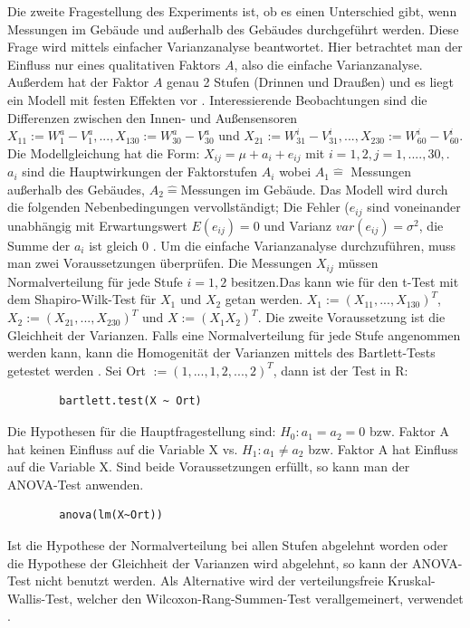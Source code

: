 \documentclass[ ngerman, fontsize= 12pt, paper=a4, headings=big, titlepage=true]{article}
\begin{document}
	Die zweite Fragestellung des Experiments ist, ob es einen Unterschied gibt, wenn Messungen im Gebäude und außerhalb des Gebäudes durchgeführt werden. Diese Frage wird mittels einfacher Varianzanalyse beantwortet. Hier betrachtet man der Einfluss nur eines qualitativen Faktors $A $, also die einfache Varianzanalyse. Außerdem hat der Faktor $A $ genau 2 Stufen (Drinnen und Draußen) und es liegt ein Modell mit festen Effekten vor \cite{3}. Interessierende Beobachtungen sind  die Differenzen zwischen den Innen- und Außensensoren $X_{11} := W^a_1 - V^a_1, ..., X_{1 30} := W^a_{30} - V^a_{30} $ und $X_{21} := W^i_{31} - V^i_{31}, ..., X_{2 30} := W^i_{60} - V^i_{60}  $. \\ 
	
	Die Modellgleichung hat die Form: $ X_{ij} = \mu + a_i + e_{ij}  $ mit $ i = 1, 2, j = 1,...., 30, $. $a_i $ sind die Hauptwirkungen der Faktorstufen $A_i $ wobei $ A_1 \hat{=} $ Messungen außerhalb des Gebäudes, $ A_2 \hat{=} $Messungen im Gebäude. Das Modell wird durch die folgenden Nebenbedingungen vervollständigt; Die Fehler ($e_{ij} $ sind voneinander unabhängig mit Erwartungswert $E(e_{ij}) = 0 $ und Varianz $var(e_{ij} ) = \sigma^2 $, die Summe der $a_i $ ist gleich 0 \cite{3}. Um die einfache Varianzanalyse durchzuführen, muss man zwei Voraussetzungen überprüfen. Die Messungen $X_{ij} $  müssen Normalverteilung für jede Stufe $i = 1, 2 $ besitzen.Das kann wie für den t-Test mit dem Shapiro-Wilk-Test für $X_1 $ und $X_2 $ getan werden. $X_1 := (X_{11}, ..., X_{1 30})^T $, $ X_2 := (X_{21}, ..., X_{2 30})^T $ und $X := (X_1 X_2)^T $. Die zweite Voraussetzung ist die Gleichheit der Varianzen. Falls eine Normalverteilung für jede Stufe angenommen werden kann, kann die Homogenität der Varianzen mittels des Bartlett-Tests getestet werden  \cite{4}. Sei Ort $:= (1,...,1,2,...,2)^T $, dann ist der Test in R: \begin{lstlisting}
		bartlett.test(X ~ Ort)
	\end{lstlisting}

	Die Hypothesen für die Hauptfragestellung sind: $ H_0: a_1 = a_2 = 0 $ bzw. Faktor A hat keinen Einfluss auf die Variable X  vs.  $H_1: a_1 \neq a_2 $ bzw. Faktor A hat Einfluss auf die Variable X. Sind beide Voraussetzungen erfüllt, so kann man der ANOVA-Test anwenden.\begin{lstlisting}
		anova(lm(X~Ort))
	\end{lstlisting}  

	Ist die Hypothese der Normalverteilung bei allen Stufen abgelehnt worden oder die Hypothese der Gleichheit der Varianzen wird abgelehnt, so kann der ANOVA-Test nicht benutzt werden. Als Alternative wird der verteilungsfreie Kruskal-Wallis-Test, welcher den Wilcoxon-Rang-Summen-Test verallgemeinert, verwendet \cite{4}.
	
\end{document}

